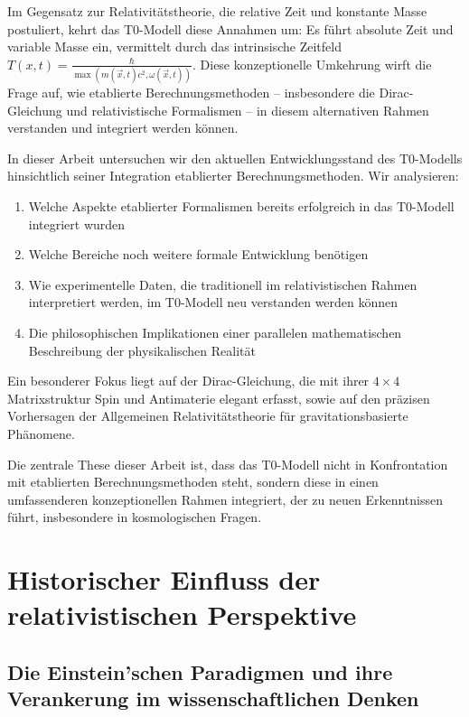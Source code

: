 \documentclass[12pt,a4paper]{article}
\newcommand{\Tfieldt}{T(x,t)}
\newcommand{\vecx}{\vec{x}}
\begin{document}
	Im Gegensatz zur Relativitätstheorie, die relative Zeit und konstante Masse postuliert, kehrt das T0-Modell diese Annahmen um: Es führt absolute Zeit und variable Masse ein, vermittelt durch das intrinsische Zeitfeld $\Tfieldt = \frac{\hbar}{\max(m(\vecx,t)c^2, \omega(\vecx,t))}$. Diese konzeptionelle Umkehrung wirft die Frage auf, wie etablierte Berechnungsmethoden – insbesondere die Dirac-\hspace{0pt}Gleichung und relativistische Formalismen – in diesem alternativen Rahmen verstanden und integriert werden können.
	
	In dieser Arbeit untersuchen wir den aktuellen Entwicklungsstand des T0-Modells hinsichtlich seiner Integration etablierter Berechnungsmethoden. Wir analysieren:
	
	\begin{enumerate}
		\item Welche Aspekte etablierter Formalismen bereits erfolgreich in das T0-Modell integriert wurden
		\item Welche Bereiche noch weitere formale Entwicklung benötigen
		\item Wie experimentelle Daten, die traditionell im relativistischen Rahmen interpretiert werden, im T0-Modell neu verstanden werden können
		\item Die philosophischen Implikationen einer parallelen mathematischen Beschreibung der physikalischen Realität
	\end{enumerate}
	
	Ein besonderer Fokus liegt auf der Dirac-\hspace{0pt}Gleichung, die mit ihrer $4 \times 4$ Matrixstruktur Spin und Antimaterie elegant erfasst, sowie auf den präzisen Vorhersagen der Allgemeinen Relativitätstheorie für gravitationsbasierte Phänomene.
	
	Die zentrale These dieser Arbeit ist, dass das T0-Modell nicht in Konfrontation mit etablierten Berechnungsmethoden steht, sondern diese in einen umfassenderen konzeptionellen Rahmen integriert, der zu neuen Erkenntnissen führt, insbesondere in kosmologischen Fragen.
	
	\section{Historischer Einfluss der relativistischen Perspektive}
	\label{sec:historical_bias}
	
	\subsection{Die Einstein'schen Paradigmen und ihre Verankerung im wissenschaftlichen Denken}
	\label{subsec:einstein_paradigms}
	
\end{document}
